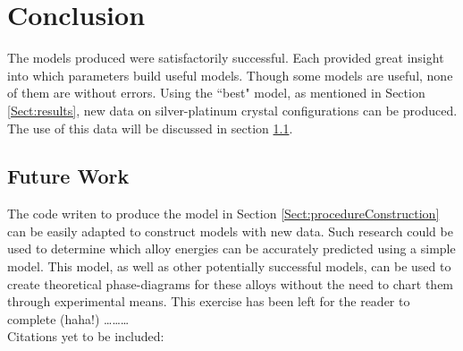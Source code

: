 \section{Conclusion}\label{Sect:conclusion}
\par The models produced were satisfactorily successful. Each provided great insight into which parameters build useful models. Though some models are useful, none of them are without errors. Using the ``best" model, as mentioned in Section \ref{Sect:results}, new data on silver-platinum crystal configurations can be produced. The use of this data will be discussed in section \ref{Sect:futureWork}.

\subsection{Future Work}\label{Sect:futureWork}
\par The code writen to produce the model in Section \ref{Sect:procedureConstruction} can be easily adapted to construct models with new data. Such research could be used to determine which alloy energies can be accurately predicted using a simple model. This model, as well as other potentially successful models, can be used to create theoretical phase-diagrams for these alloys without the need to chart them through experimental means. This exercise has been left for the reader to complete (haha!) \ldots\ldots\ldots \\
Citations yet to be included: \cite{_AFLOW} \cite{Kohn1965} \cite{curt2005scienceandtech} \cite{curtarolo2003predicting} \cite{Kresse:1999wc} \cite{kresse1993abinitio} \cite{Blochl:1994dx} \cite{kresse1996efficiency} \cite{monkhorst1976special} \cite{sanchez1984generalized} \cite{laks1992efficient} \cite{lerch2009uncle} \cite{cockayne2010building} \cite{nelson2013compressive}